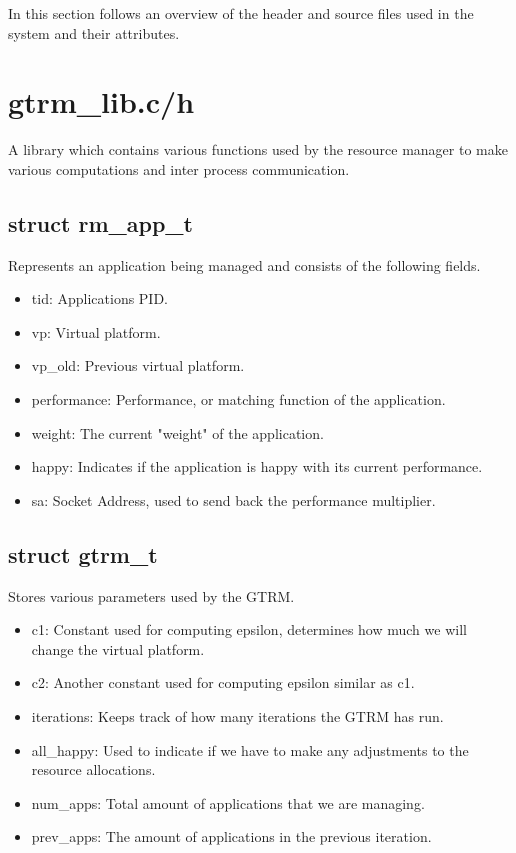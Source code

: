 \documentclass[nobiblatex]{LTHthesis}
\begin{document}
In this section follows an overview of the header and source files used in the system and their attributes.

\section{gtrm\_lib.c/h}
A library which contains various functions used by the resource manager to make various computations and inter process communication.

\subsection{struct rm\_app\_t}
Represents an application being managed and consists of the following fields.
\begin{itemize}
\item tid: Applications PID.
\item vp: Virtual platform.
\item vp\_old: Previous virtual platform.
\item performance: Performance, or matching function of the application.
\item weight: The current "weight" of the application.
\item happy: Indicates if the application is happy with its current performance.
\item sa: Socket Address, used to send back the performance multiplier.
\end{itemize}

\subsection{struct gtrm\_t}
Stores various parameters used by the GTRM.
\begin{itemize}
\item c1: Constant used for computing epsilon, determines how much we will change the virtual platform.
\item c2: Another constant used for computing epsilon similar as c1.
\item iterations: Keeps track of how many iterations the GTRM has run.
\item all\_happy: Used to indicate if we have to make any adjustments to the resource allocations.
\item num\_apps: Total amount of applications that we are managing.
\item prev\_apps: The amount of applications in the previous iteration.
\end{itemize}
\end{document}
